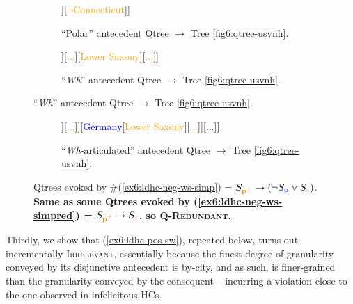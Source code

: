 \begin{figure}[H]
	\centering
	\begin{subfigure}[b]{.45\linewidth}
		\centering
		\begin{forest}
			[CS[{\textcolor{orange}{Connecticut}}[\fbox{\textcolor{pink}{New Haven}}][\textcolor{pink}{...}]][{\textcolor{orange}{$\neg$Connecticut}}]]
		\end{forest}
		\caption{``Polar'' antecedent Qtree $\rightarrow$ Tree \ref{fig6:qtree-usvnh}.}
	\end{subfigure}
	\hfill
	\begin{subfigure}[b]{.45\linewidth}
		\centering
		\begin{forest}
			[CS[{\textcolor{orange}{Connecticut}}[\fbox{\textcolor{pink}{New Haven}}][\textcolor{pink}{...}]][{\textcolor{orange}{...}}][{\textcolor{orange}{Lower Saxony}}][{\textcolor{orange}{...}}]]
		\end{forest}
		\caption{``\textit{Wh}'' antecedent Qtree $\rightarrow$ Tree \ref{fig6:qtree-usvnh}.}
	\end{subfigure}
\end{figure}
\begin{figure}[H]
\ContinuedFloat
\centering
	\begin{subfigure}[b]{.45\linewidth}
		\centering
		\begin{forest}
			[CS[\textcolor{blue}{US}[{\textcolor{orange}{Connecticut}}[\fbox{\textcolor{pink}{New Haven}}][\textcolor{pink}{...}]][\textcolor{orange}{...}]][{\textcolor{blue}{Germany}}[\textcolor{orange}{Lower Saxony}][\textcolor{orange}{...}]][{\textcolor{blue}{...}}]]
		\end{forest}
		\caption{``\textit{Wh}-articulated'' antecedent Qtree $\rightarrow$ Tree \ref{fig6:qtree-usvnh}.}
	\end{subfigure}
	\caption[]{Qtrees evoked by \#(\ref{ex6:ldhc-neg-ws-simp}) = $S_{\pplus} \rightarrow (\neg S_{\p} \vee S_{\s})$.\\\textbf{Same as some Qtrees evoked by (\ref{ex6:ldhc-neg-ws-simpred}) = $S_{\pplus} \rightarrow S_{\s}$, so \textsc{Q-Redundant}.}}\label{fig6:qtree-ctt(usvnh)}
\end{figure}

Thirdly, we show that (\ref{ex6:ldhc-pos-sw}), repeated below, turns out incrementally \textsc{Irrelevant}, essentially because the finest degree of granularity conveyed by its disjunctive antecedent is by-city, and as such, is finer-grained than the granularity conveyed by the consequent -- incurring a violation close to the one observed in infelicitous HCs.


